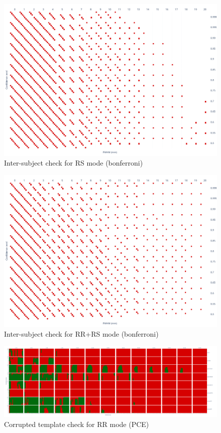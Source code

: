 \documentclass{article}
\begin{document}
\begin{figure}
    \centering
    \includegraphics[width=\linewidth]{figures/one_mct_fwe_bonferroni__RS.pdf}
    \caption{Inter-subject check for RS mode (bonferroni)}
\end{figure}

\begin{figure}
    \centering
    \includegraphics[width=\linewidth]{figures/one_mct_fwe_bonferroni__RR+RS.pdf}
    \caption{Inter-subject check for RR+RS mode (bonferroni)}
\end{figure}

\begin{figure}
    \centering
    \includegraphics[width=\linewidth]{figures/one_pce_template_RR.pdf}
    \caption{Corrupted template check for RR mode (PCE)}
\end{figure}
\end{document}
